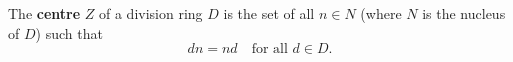 The \textbf{centre} $Z$ of a division ring $D$ is the set of all $n \in N$ (where $N$ is the nucleus of $D$) such that
$$dn = nd \quad \text{for all } d \in D.$$
